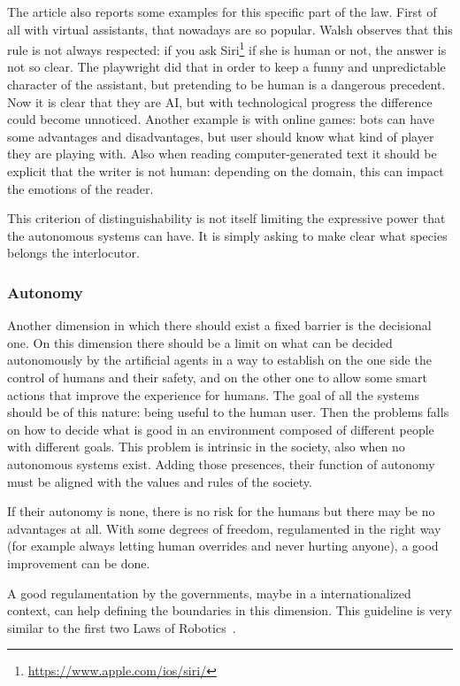 The article also reports some examples for this specific part of the law. First of all with virtual assistants, that nowadays are so popular. Walsh observes that this rule is not always respected: if you ask Siri\footnote{\url{https://www.apple.com/ios/siri/}} if she is human or not, the answer is not so clear. The playwright did that in order to keep a funny and unpredictable character of the assistant, but pretending to be human is a dangerous precedent. Now it is clear that they are AI, but with technological progress the difference could become unnoticed. Another example is with online games: bots can have some advantages and disadvantages, but user should know what kind of player they are playing with. Also when reading computer-generated text it should be explicit that the writer is not human: depending on the domain, this can impact the emotions of the reader.

This criterion of distinguishability is not itself limiting the expressive power that the autonomous systems can have. It is simply asking to make clear what species belongs the interlocutor.

\subsubsection{Autonomy}
Another dimension in which there should exist a fixed barrier is the decisional one. On this dimension there should be a limit on what can be decided autonomously by the artificial agents in a way to establish on the one side the control of humans and their safety, and on the other one to allow some smart actions that improve the experience for humans. The goal of all the systems should be of this nature: being useful to the human user. Then the problems falls on how to decide what is good in an environment composed of different people with different goals. This problem is intrinsic in the society, also when no autonomous systems exist. Adding those presences, their function of autonomy must be aligned with the values and rules of the society.

If their autonomy is none, there is no risk for the humans but there may be no advantages at all. With some degrees of freedom, regulamented in the right way (for example always letting human overrides and never hurting anyone), a good improvement can be done.

A good regulamentation by the governments, maybe in a internationalized context, can help defining the boundaries in this dimension. This guideline is very similar to the first two Laws of Robotics~\cite{asimov1942runaround}.

